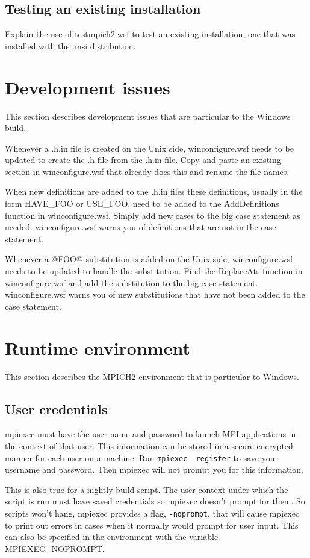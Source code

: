 \documentclass[dvipdfm,11pt]{article}
\begin{document}
\subsection{Testing an existing installation}
Explain the use of testmpich2.wsf to test an existing installation, one that was installed
with the .msi distribution.

\section{Development issues}
This section describes development issues that are particular to the Windows build.

Whenever a .h.in file is created on the Unix side, winconfigure.wsf needs to be updated to
create the .h file from the .h.in file.  Copy and paste an existing section in 
winconfigure.wsf that already does this and rename the file names.

When new definitions are added to the .h.in files these definitions, usually in the form HAVE\_FOO 
or USE\_FOO, need to be added to the AddDefinitions function in winconfigure.wsf.  Simply add 
new cases to the big case statement as needed.  winconfigure.wsf warns you of definitions that 
are not in the case statement.

Whenever a @FOO@ substitution is added on the Unix side, winconfigure.wsf needs to be updated
to handle the substitution.  Find the ReplaceAts function in winconfigure.wsf and add the 
substitution to the big case statement.  winconfigure.wsf warns you of new substitutions that
have not been added to the case statement.

\section{Runtime environment}

This section describes the MPICH2 environment that is particular to Windows.

\subsection{User credentials}
mpiexec must have the user name and password to launch MPI applications in the context of
that user.  This information can be stored in a secure encrypted manner for each user on a
machine.  Run \texttt{mpiexec -register} to save your username and password.  Then mpiexec
will not prompt you for this information.

This is also true for a nightly build script.  The user context under which the script is 
run must have saved credentials so mpiexec doesn't prompt for them.  So scripts won't hang,
mpiexec provides a flag, \texttt{-noprompt}, that will cause mpiexec to print out errors in 
cases when it normally would prompt for user input.  This can also be specified in the 
environment with the variable MPIEXEC\_NOPROMPT.
\end{document}

